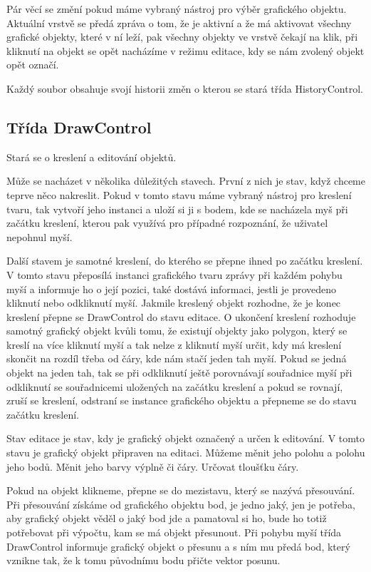 \documentclass[
  field=inf,
  biblatex,
  glossaries,
  index
]{kidiplom}
\begin{document}
Pár věcí se změní pokud máme vybraný nástroj pro výběr grafického objektu. Aktuální vrstvě se předá zpráva o tom, že je aktivní a že má aktivovat všechny grafické objekty, které v ní leží, pak všechny objekty ve vrstvě čekají na klik, při kliknutí na objekt se opět nacházíme v režimu editace, kdy se nám zvolený objekt opět označí.

Každý soubor obsahuje svojí historii změn o kterou se stará třída HistoryControl.

\subsection{Třída DrawControl}

Stará se o kreslení a editování objektů.

Může se nacházet v několika důležitých stavech. První z nich je stav, když chceme teprve něco nakreslit. Pokud v tomto stavu máme vybraný nástroj pro kreslení tvaru, tak vytvoří jeho instanci a uloží si ji s bodem, kde se nacházela myš při začátku kreslení, kterou pak využívá pro případné rozpoznání, že uživatel nepohnul myší. 

Další stavem je samotné kreslení, do kterého se přepne ihned po začátku kreslení. V tomto stavu přeposílá instanci grafického tvaru zprávy při každém pohybu myší a informuje ho o její pozici, také dostává informaci, jestli je provedeno kliknutí nebo odkliknutí myší. Jakmile kreslený objekt rozhodne, že je konec kreslení přepne se DrawControl do stavu editace. O ukončení kreslení rozhoduje samotný grafický objekt kvůli tomu, že existují objekty jako polygon, který se kreslí na více kliknutí myší a tak nelze z kliknutí myší určit, kdy má kreslení skončit na rozdíl třeba od čáry, kde nám stačí jeden tah myší. Pokud se jedná objekt na jeden tah, tak se při odkliknutí ještě porovnávají souřadnice myší při odkliknutí se souřadnicemi uložených na začátku kreslení a pokud se rovnají, zruší se kreslení, odstraní se instance grafického objektu a přepneme se do stavu začátku kreslení.

Stav editace je stav, kdy je grafický objekt označený a určen k editování. V tomto stavu je grafický objekt připraven na editaci. Můžeme měnit jeho polohu a polohu jeho bodů. Měnit jeho barvy výplně či čáry. Určovat tloušťku čáry.

Pokud na objekt klikneme, přepne se do mezistavu, který se nazývá přesouvání. Při přesouvání získáme od grafického objektu bod, je jedno jaký, jen je potřeba, aby grafický objekt věděl o jaký bod jde a pamatoval si ho, bude ho totiž potřebovat při výpočtu, kam se má objekt přesunout. Při pohybu myší třída DrawControl informuje grafický objekt o přesunu a s ním mu předá bod, který vznikne tak, že k tomu původnímu bodu přičte vektor posunu.
\end{document}
